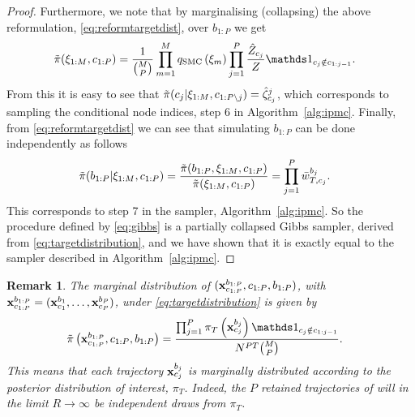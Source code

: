 \begin{proof}
	Furthermore, we note that by marginalising (collapsing) the above reformulation, \ie \eqref{eq:reformtargetdist}, over $b_{1:P}$ we get
	\begin{align*}
	\tilde\pi(\xib_{1:M}, c_{1:P}) 
	&= \frac{1}{\binom{M}{P}} \prod_{m=1}^M q_{\text{SMC}}\left(\xib_m\right) \prod_{j = 1}^P \frac{\hat Z_{c_j}}{Z}\iden_{c_j \notin c_{1:j-1}} .\nonumber
	\end{align*}
	From this it is easy to see that $\tilde\pi(c_j | \mathbf{\xi}_{1:M}, c_{1:P\backslash j}) = \hat{\zeta}_{c_j}^j$, which 
	corresponds to sampling the conditional node indices, \ie step 6 in Algorithm~\ref{alg:ipmc}. Finally, from \eqref{eq:reformtargetdist} we can see that simulating $b_{1:P}$ can be done independently as follows
	\begin{align*}
	&\tilde\pi(b_{1:P} | \mathbf{\xi}_{1:M}, c_{1:P}) = \frac{\tilde\pi(b_{1:P} ,\mathbf{\xi}_{1:M}, c_{1:P})}{\tilde\pi(\mathbf{\xi}_{1:M}, c_{1:P})} =  \prod_{j = 1}^P 
	\bar w_{T,c_j}^{b_j}
	.
	\end{align*}
	This corresponds to step 7 in the \ipmcmc sampler, Algorithm~\ref{alg:ipmc}. So the procedure defined by \eqref{eq:gibbs} is a partially collapsed Gibbs sampler, derived from \eqref{eq:targetdistribution}, and we have shown that it is exactly equal to the \ipmcmc sampler described in Algorithm~\ref{alg:ipmc}.
\end{proof}
\newtheorem{rem}{Remark}
\begin{rem}
	The marginal distribution of $(\mathbf{x}_{c_{1:P}}^{b_{1:P}},c_{1:P},b_{1:P})$, with $\mathbf{x}_{c_{1:P}}^{b_{1:P}} = (\mathbf{x}_{c_1}^{b_1},\ldots,\mathbf{x}_{c_P}^{b_P})$, under \eqref{eq:targetdistribution} is given by
	\begin{align}
	\label{eq:marginaldistribution}
	&\tilde \pi\left(\xb_{c_{1:P}}^{b_{1:P}},c_{1:P},b_{1:P}\right) = \frac{\prod_{j = 1}^P \pi_T\left(\xb_{c_j}^{b_j}\right) \iden_{c_j \notin c_{1:j-1}}}{N^{PT} \binom{M}{P}} .
	\end{align}
	This means that each trajectory $\mathbf{x}_{c_j}^{b_j}$ is marginally distributed according to the
	posterior distribution of interest, $\pi_T$. Indeed, the $P$ retained trajectories of \ipmcmc
	will in the limit $R \rightarrow \infty$ %
	be independent draws from $\pi_T$.
\end{rem}
